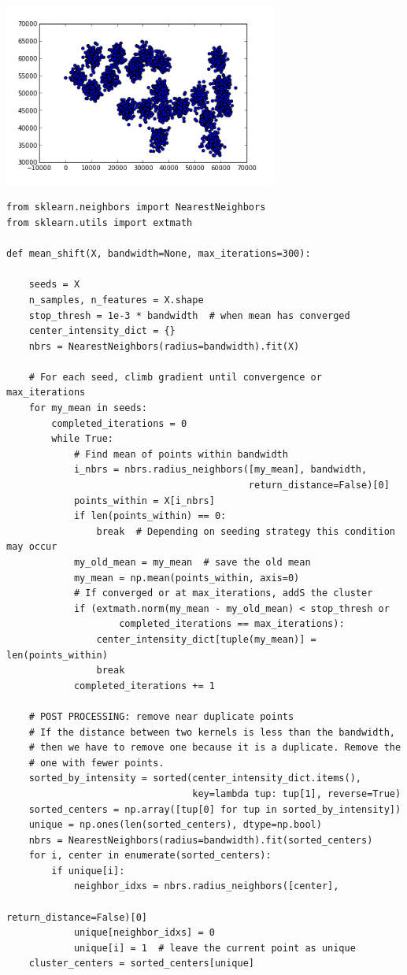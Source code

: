 \documentclass[12pt,fleqn]{article}\usepackage{../common}
\begin{document}
\includegraphics[height=6cm]{meanshift_1.png}
\begin{verbatim}
from sklearn.neighbors import NearestNeighbors
from sklearn.utils import extmath

def mean_shift(X, bandwidth=None, max_iterations=300):
    
    seeds = X
    n_samples, n_features = X.shape
    stop_thresh = 1e-3 * bandwidth  # when mean has converged
    center_intensity_dict = {}
    nbrs = NearestNeighbors(radius=bandwidth).fit(X)

    # For each seed, climb gradient until convergence or max_iterations
    for my_mean in seeds:
        completed_iterations = 0
        while True:
            # Find mean of points within bandwidth
            i_nbrs = nbrs.radius_neighbors([my_mean], bandwidth,
                                           return_distance=False)[0]
            points_within = X[i_nbrs]
            if len(points_within) == 0:
                break  # Depending on seeding strategy this condition may occur
            my_old_mean = my_mean  # save the old mean
            my_mean = np.mean(points_within, axis=0)
            # If converged or at max_iterations, addS the cluster
            if (extmath.norm(my_mean - my_old_mean) < stop_thresh or
                    completed_iterations == max_iterations):
                center_intensity_dict[tuple(my_mean)] = len(points_within)
                break
            completed_iterations += 1

    # POST PROCESSING: remove near duplicate points
    # If the distance between two kernels is less than the bandwidth,
    # then we have to remove one because it is a duplicate. Remove the
    # one with fewer points.
    sorted_by_intensity = sorted(center_intensity_dict.items(),
                                 key=lambda tup: tup[1], reverse=True)
    sorted_centers = np.array([tup[0] for tup in sorted_by_intensity])
    unique = np.ones(len(sorted_centers), dtype=np.bool)
    nbrs = NearestNeighbors(radius=bandwidth).fit(sorted_centers)
    for i, center in enumerate(sorted_centers):
        if unique[i]:
            neighbor_idxs = nbrs.radius_neighbors([center],
                                                  return_distance=False)[0]
            unique[neighbor_idxs] = 0
            unique[i] = 1  # leave the current point as unique
    cluster_centers = sorted_centers[unique]


\end{verbatim}
\end{document}
